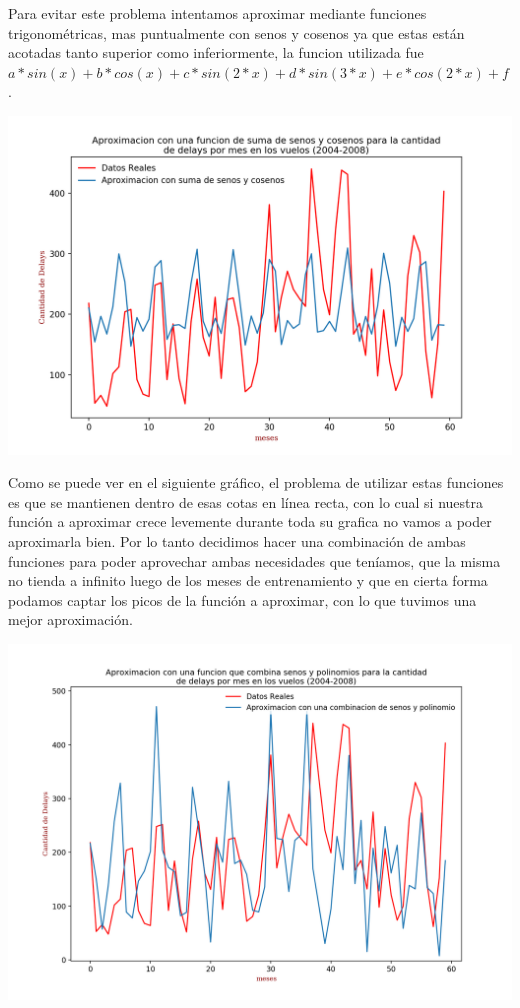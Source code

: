 \documentclass{endm}
\begin{document}
Para evitar este problema intentamos aproximar mediante funciones trigonom\'etricas, mas puntualmente con senos y cosenos ya que estas están acotadas tanto superior como inferiormente, la funcion utilizada fue $a*sin(x)+ b*cos(x)+c*sin(2*x)+ d*sin(3*x)+ e*cos(2*x)+f$.

	\begin{center}
	\includegraphics[scale=0.6]{imagenes/senosCosenos.png}
	\end{center}

Como se puede ver en el siguiente gr\'afico, el problema de utilizar estas funciones es que se mantienen dentro de esas cotas en l\'inea recta, con lo cual si nuestra funci\'on a aproximar crece levemente durante toda su grafica no vamos a poder aproximarla bien.
Por lo tanto decidimos hacer una combinaci\'on de ambas funciones para poder aprovechar ambas necesidades que ten\'iamos, que la misma no tienda a infinito luego de los meses de entrenamiento y que en cierta forma podamos captar los picos de la funci\'on a aproximar, con lo que tuvimos una mejor aproximaci\'on.

	\begin{center}
	\includegraphics[scale=0.5]{imagenes/polinomioysenos.png}
	\end{center}
\end{document}
